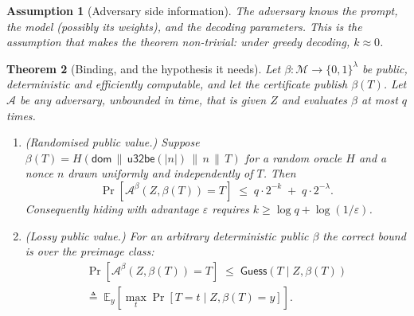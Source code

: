 \documentclass[journal]{IEEEtran}
\newtheorem{theorem}{Theorem}
\newtheorem{assumption}[theorem]{Assumption}
\begin{document}
\begin{assumption}[Adversary side information]
\label{as:Z}
The adversary knows the prompt, the model (possibly its weights), and the
decoding parameters. \emph{This is the assumption that makes the theorem
non-trivial}: under greedy decoding, $k \approx 0$.
\end{assumption}

\begin{theorem}[Binding, and the hypothesis it needs]
\label{thm:t1}
Let $\beta : \mathcal{M} \to \{0,1\}^\lambda$ be public, deterministic and
efficiently computable, and let the certificate publish $\beta(T)$. Let
$\mathcal{A}$ be any adversary, unbounded in time, that is given $Z$ and
evaluates $\beta$ at most $q$ times.
\begin{enumerate}
\item[(H)] \emph{(Randomised public value.)} Suppose
  $\beta(T) = H(\mathsf{dom} \,\|\, \mathsf{u32be}(|n|) \,\|\, n \,\|\, T)$ for a
  random oracle $H$ and a nonce $n$ drawn uniformly and \emph{independently of
  $T$}. Then
  \[
  \Pr\!\left[\mathcal{A}^\beta\!\left(Z, \beta(T)\right) = T\right]
  \;\le\; q \cdot 2^{-k} \;+\; q \cdot 2^{-\lambda}.
  \]
  Consequently hiding with advantage $\varepsilon$ requires
  $k \ge \log q + \log(1/\varepsilon)$.
\item[(L)] \emph{(Lossy public value.)} For an arbitrary deterministic public
  $\beta$ the correct bound is over the \emph{preimage class}:
  \begin{multline*}
  \Pr\!\left[\mathcal{A}^\beta\!\left(Z, \beta(T)\right) = T\right]
  \;\le\; \mathsf{Guess}\!\left(T \mid Z, \beta(T)\right) \\
  \triangleq\; \mathbb{E}_y\!\left[\max_t \Pr[T = t \mid Z, \beta(T) = y]\right].
  \end{multline*}
\end{enumerate}
\end{theorem}
\end{document}
